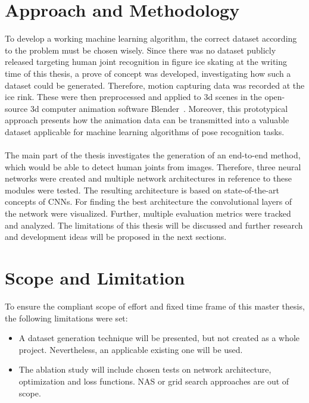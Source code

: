 \section{Approach and Methodology}
To develop a working machine learning algorithm, the correct dataset according to the problem must be chosen wisely.
Since there was no dataset publicly released targeting human joint recognition in figure ice skating at the writing time
of this thesis, a prove of concept was developed, investigating how such a dataset could be generated.
Therefore, motion capturing data was recorded at the ice rink.
These were then preprocessed and applied to 3d scenes in the open-source 3d computer animation software Blender~\cite{blender}.
Moreover, this prototypical approach presents how the animation data can be transmitted into a valuable dataset applicable for machine learning
algorithms of pose recognition tasks.
\\\mbox{}\\
The main part of the thesis investigates the generation of an end-to-end method, which would be able to detect human joints
from images.
Therefore, three neural networks were created and multiple network architectures in reference to these modules were tested.
The resulting architecture is based on state-of-the-art concepts of \glspl{CNN}.
For finding the best architecture the convolutional layers of the network were visualized.
Further, multiple evaluation metrics were tracked and analyzed.
The limitations of this thesis will be discussed and further research and development ideas will be proposed in the next sections.



\section{Scope and Limitation}
\label{limitations}
To ensure the compliant scope of effort and fixed time frame of this master thesis, the following limitations were set:

\begin{itemize}
    \item A dataset generation technique will be presented, but not created as a whole project.
    Nevertheless, an applicable existing one will be used.
    \item The ablation study will include chosen tests on network architecture, optimization and loss functions.
    \gls{NAS} or grid search approaches are out of scope.
\end{itemize}
